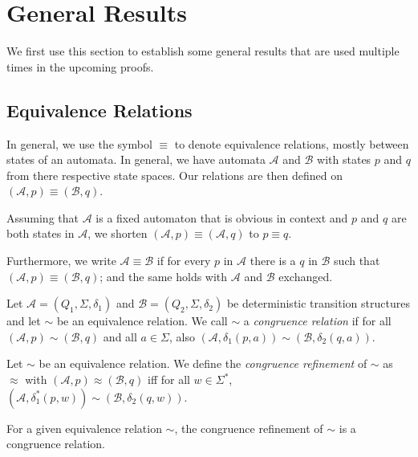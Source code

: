 \section{General Results}
We first use this section to establish some general results that are used multiple times in the upcoming proofs.

\subsection{Equivalence Relations}

In general, we use the symbol $\equiv$ to denote equivalence relations, mostly between states of an automata. In general, we have automata $\mathcal{A}$ and $\mathcal{B}$ with states $p$ and $q$ from there respective state spaces. Our relations are then defined on $(\mathcal{A}, p) \equiv (\mathcal{B}, q)$.

\begin{defn}
	Assuming that $\mathcal{A}$ is a fixed automaton that is obvious in context and $p$ and $q$ are both states in $\mathcal{A}$, we shorten $(\mathcal{A}, p) \equiv (\mathcal{A}, q)$ to $p \equiv q$.
	
	Furthermore, we write $\mathcal{A} \equiv \mathcal{B}$ if for every $p$ in $\mathcal{A}$ there is a $q$ in $\mathcal{B}$ such that $(\mathcal{A}, p) \equiv (\mathcal{B}, q)$; and the same holds with $\mathcal{A}$ and $\mathcal{B}$ exchanged.
\end{defn}

\begin{defn}
	Let $\mathcal{A} = (Q_1, \Sigma, \delta_1)$ and $\mathcal{B} = (Q_2, \Sigma, \delta_2)$ be deterministic transition structures and let $\sim$ be an equivalence relation. We call $\sim$ a \emph{congruence relation} if for all $(\mathcal{A}, p) \sim (\mathcal{B}, q)$ and all $a \in \Sigma$, also $(\mathcal{A}, \delta_1(p, a)) \sim (\mathcal{B}, \delta_2(q, a))$.
\end{defn}

\begin{defn}
	Let $\sim$ be an equivalence relation. We define the \emph{congruence refinement} of $\sim$ as $\approx$ with $(\mathcal{A}, p) \approx (\mathcal{B}, q)$ iff for all $w \in \Sigma^*$, $(\mathcal{A}, \delta_1^*(p, w)) \sim (\mathcal{B}, \delta_2(q, w))$.
\end{defn}

\begin{lem}
	For a given equivalence relation $\sim$, the congruence refinement of $\sim$ is a congruence relation.
\end{lem}

